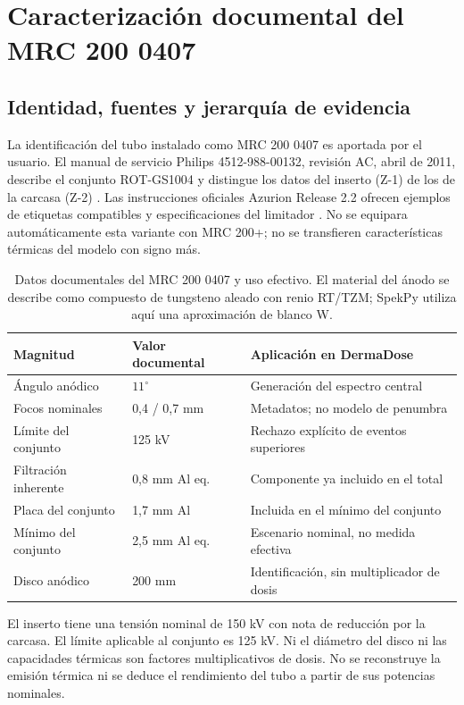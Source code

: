 \chapter{Caracterización documental del MRC 200 0407}
\label{chap:mrc200}
\section{Identidad, fuentes y jerarquía de evidencia}
La identificación del tubo instalado como MRC 200 0407 es aportada por el usuario. El manual de servicio Philips 4512-988-00132, revisión AC, abril de 2011, describe el conjunto ROT-GS1004 y distingue los datos del inserto (Z-1) de los de la carcasa (Z-2) \citep{mrcservice}. Las instrucciones oficiales Azurion Release 2.2 ofrecen ejemplos de etiquetas compatibles y especificaciones del limitador \citep{azurion22}. No se equipara automáticamente esta variante con MRC 200+; no se transfieren características térmicas del modelo con signo más.

\begin{table}[htbp]\centering\small
\begin{tabularx}{\linewidth}{l l X}\toprule
Magnitud & Valor documental & Aplicación en DermaDose\\\midrule
Ángulo anódico & $11^\circ$ & Generación del espectro central\\
Focos nominales & 0,4 / 0,7 mm & Metadatos; no modelo de penumbra\\
Límite del conjunto & 125 kV & Rechazo explícito de eventos superiores\\
Filtración inherente & 0,8 mm Al eq. & Componente ya incluido en el total\\
Placa del conjunto & 1,7 mm Al & Incluida en el mínimo del conjunto\\
Mínimo del conjunto & 2,5 mm Al eq. & Escenario nominal, no medida efectiva\\
Disco anódico & 200 mm & Identificación, sin multiplicador de dosis\\\bottomrule
\end{tabularx}\caption{Datos documentales del MRC 200 0407 y uso efectivo. El material del ánodo se describe como compuesto de tungsteno aleado con renio RT/TZM; SpekPy utiliza aquí una aproximación de blanco W.}\end{table}
El inserto tiene una tensión nominal de 150 kV con nota de reducción por la carcasa. El límite aplicable al conjunto es 125 kV. Ni el diámetro del disco ni las capacidades térmicas son factores multiplicativos de dosis. No se reconstruye la emisión térmica ni se deduce el rendimiento del tubo a partir de sus potencias nominales.

